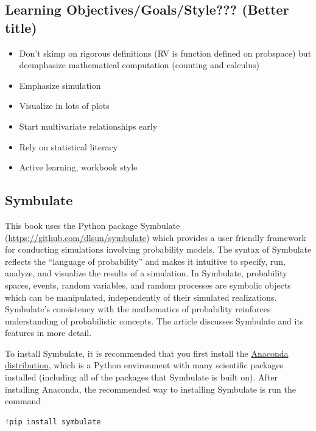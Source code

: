 \documentclass[
]{book}
\providecommand{\tightlist}{%
  \setlength{\itemsep}{0pt}\setlength{\parskip}{0pt}}
\theoremstyle{definition}
\theoremstyle{definition}
\theoremstyle{definition}
\theoremstyle{remark}
\begin{document}
\hypertarget{learning-objectivesgoalsstyle-better-title}{%
\subsection{Learning Objectives/Goals/Style??? (Better title)}\label{learning-objectivesgoalsstyle-better-title}}

\begin{itemize}
\tightlist
\item
  Don't skimp on rigorous definitions (RV is function defined on probspace) but deemphasize mathematical computation (counting and calculus)
\item
  Emphasize simulation
\item
  Visualize in lots of plots
\item
  Start multivariate relationships early
\item
  Rely on statistical literacy
\item
  Active learning, workbook style
\end{itemize}

\hypertarget{symbulate}{%
\subsection*{Symbulate}\label{symbulate}}

This book uses the Python package Symbulate
(\url{https://github.com/dlsun/symbulate}) which provides a user friendly framework for conducting simulations involving probability models. The
syntax of Symbulate reflects the ``language of probability'' and makes it
intuitive to specify, run, analyze, and visualize the results of a
simulation. In Symbulate, probability spaces, events, random variables, and random processes are symbolic objects which can be manipulated, independently of their simulated realizations. Symbulate's consistency with the mathematics of
probability reinforces understanding of probabilistic concepts. The article \citet{symbulateJSE} discusses Symbulate and its features in more detail.

To install Symbulate, it is recommended that you first install the \href{https://www.anaconda.com/distribution/}{Anaconda distribution}, which is a Python environment with many scientific packages installed (including all of the packages that Symbulate is built on). After installing Anaconda, the recommended way to installing Symbulate is run the command

\begin{verbatim}
!pip install symbulate
\end{verbatim}
\end{document}
